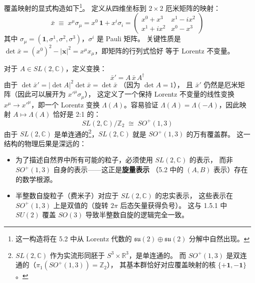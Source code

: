 \begin{center}
\end{center}

\noindent 覆盖映射的显式构造如下\footnote{
这一构造将在 5.2 中从 Lorentz 代数的
$\mathfrak{su}(2)\oplus\mathfrak{su}(2)$ 分解中自然出现。}。
定义从四维坐标到 $2\times 2$ 厄米矩阵的映射：
\begin{equation}\label{eq:x-to-matrix}
  \bar{x} \;\equiv\; x^\mu\sigma_\mu
  = x^0\,\mathbf{1} + x^i\sigma_i
  = \begin{pmatrix}
      x^0 + x^3 & x^1 - ix^2 \\
      x^1 + ix^2 & x^0 - x^3
    \end{pmatrix}
\end{equation}
其中 $\sigma_\mu = (\mathbf{1}, \sigma^1, \sigma^2, \sigma^3)$，$\sigma^i$ 是 Pauli 矩阵。
关键性质是 $\det\bar{x} = (x^0)^2 - |\mathbf{x}|^2 = x^\mu x_\mu$，即矩阵的行列式恰好
等于 Lorentz 不变量。

对于 $A \in SL(2,\mathbb{C})$，定义变换：
\begin{equation}\label{eq:SL2C-action}
  \bar{x}' = A\,\bar{x}\,A^\dagger
\end{equation}
由于 $\det\bar{x}' = |\det A|^2\det\bar{x} = \det\bar{x}$
（因为 $\det A = 1$），
且 $\bar{x}'$ 仍然是厄米矩阵（因此可以展开为 $x'^\mu\sigma_\mu$），
这定义了一个保持 Lorentz 不变量的线性变换 $x^\mu \to x'^\mu$，即一个 Lorentz 变换
$\Lambda(A)$。容易验证 $\Lambda(A) = \Lambda(-A)$，因此映射 $A \mapsto \Lambda(A)$ 恰好是 2:1 的：
\begin{equation}
  SL(2,\mathbb{C})\big/\mathbb{Z}_2 \;\cong\; SO^+(1,3)
\end{equation}
由于 $SL(2,\mathbb{C})$ 是单连通的\footnote{
$SL(2,\mathbb{C})$ 作为实流形同胚于 $S^3 \times \mathbb{R}^3$，是单连通的。
而 $SO^+(1,3)$ 是双连通的（$\pi_1(SO^+(1,3)) = \mathbb{Z}_2$），
其基本群恰好对应覆盖映射的核 $\{+\mathbf{1}, -\mathbf{1}\}$。
}，$SL(2,\mathbb{C})$ 就是 $SO^+(1,3)$ 的万有覆盖群。
这一结构的物理后果是深远的：
\begin{itemize}
  \item 为了描述自然界中所有可能的粒子，必须使用 $SL(2,\mathbb{C})$ 的表示，
        而非 $SO^+(1,3)$ 自身的表示——这正是\textbf{旋量表示}
        （5.2 中的 $(A,B)$ 表示）存在的数学根源。
  \item 半整数自旋粒子（费米子）对应于 $SL(2,\mathbb{C})$ 的忠实表示，
        这些表示在 $SO^+(1,3)$ 上是双值的（旋转 $2\pi$ 后态矢量获得负号）。
        这与 1.5.1 中 $SU(2)$ 覆盖 $SO(3)$ 导致半整数自旋的逻辑完全一致。
\end{itemize}